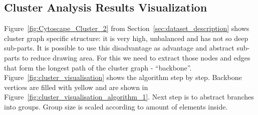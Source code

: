 \subsection{Cluster Analysis Results Visualization}
\label{sec:cluster}

Figure~\ref{fig:Cytoscape_Cluster_2} from Section~\ref{sec:dataset_description} shows cluster graph specific structure: it is very high, unbalanced and has not so deep sub-parts.
It is possible to use this disadvantage as advantage and abstract sub-parts to reduce drawing area.
For this we need to extract those nodes and edges that form the longest path of the cluster graph - ``backbone''. Figure~\ref{fig:cluster_visualisation} shows the algorithm step by step.
Backbone vertices are filled with yellow and are shown in Figure~\ref{fig:cluster_visualisation_algorithm_1}.
Next step is to abstract branches into groups. Group size is scaled according to amount of elements inside.

